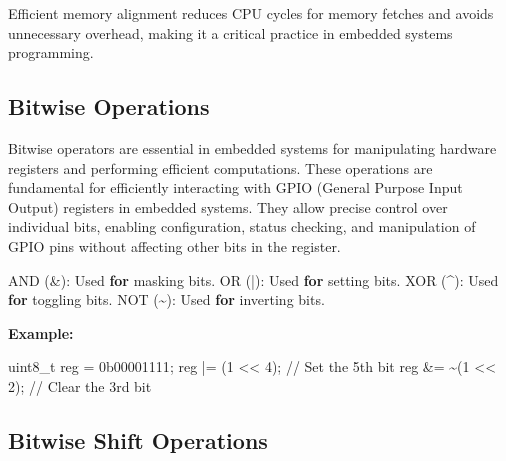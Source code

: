 \documentclass[
  9pt,
  letterpaper,
  abstract,
  titlepage]{scrbook}
\newenvironment{Shaded}{\begin{snugshade}}{\end{snugshade}}
\newcommand{\BaseNTok}[1]{\textcolor[rgb]{0.68,0.00,0.00}{#1}}
\newcommand{\CommentTok}[1]{\textcolor[rgb]{0.37,0.37,0.37}{#1}}
\newcommand{\ControlFlowTok}[1]{\textcolor[rgb]{0.00,0.23,0.31}{\textbf{#1}}}
\newcommand{\DataTypeTok}[1]{\textcolor[rgb]{0.68,0.00,0.00}{#1}}
\newcommand{\DecValTok}[1]{\textcolor[rgb]{0.68,0.00,0.00}{#1}}
\newcommand{\NormalTok}[1]{\textcolor[rgb]{0.00,0.23,0.31}{#1}}
\newcommand{\OperatorTok}[1]{\textcolor[rgb]{0.37,0.37,0.37}{#1}}
\begin{document}
Efficient memory alignment reduces CPU cycles for memory fetches and
avoids unnecessary overhead, making it a critical practice in embedded
systems programming.

\subsection{Bitwise Operations}\label{bitwise-operations}

Bitwise operators are essential in embedded systems for manipulating
hardware registers and performing efficient computations. These
operations are fundamental for efficiently interacting with GPIO
(General Purpose Input Output) registers in embedded systems. They allow
precise control over individual bits, enabling configuration, status
checking, and manipulation of GPIO pins without affecting other bits in
the register.

\begin{Shaded}
\begin{Highlighting}[]
\NormalTok{AND }\OperatorTok{(\&):}\NormalTok{ Used }\ControlFlowTok{for}\NormalTok{ masking bits}\OperatorTok{.}
\NormalTok{OR }\OperatorTok{(|):}\NormalTok{ Used }\ControlFlowTok{for}\NormalTok{ setting bits}\OperatorTok{.}
\NormalTok{XOR }\OperatorTok{(\^{}):}\NormalTok{ Used }\ControlFlowTok{for}\NormalTok{ toggling bits}\OperatorTok{.}
\NormalTok{NOT }\OperatorTok{(\textasciitilde{}):}\NormalTok{ Used }\ControlFlowTok{for}\NormalTok{ inverting bits}\OperatorTok{.}
\end{Highlighting}
\end{Shaded}

\textbf{Example:}

\begin{Shaded}
\begin{Highlighting}[]
\DataTypeTok{uint8\_t}\NormalTok{ reg }\OperatorTok{=} \BaseNTok{0b00001111}\OperatorTok{;}
\NormalTok{reg }\OperatorTok{|=} \OperatorTok{(}\DecValTok{1} \OperatorTok{\textless{}\textless{}} \DecValTok{4}\OperatorTok{);} \CommentTok{// Set the 5th bit}
\NormalTok{reg }\OperatorTok{\&=} \OperatorTok{\textasciitilde{}(}\DecValTok{1} \OperatorTok{\textless{}\textless{}} \DecValTok{2}\OperatorTok{);} \CommentTok{// Clear the 3rd bit}
\end{Highlighting}
\end{Shaded}

\subsection{Bitwise Shift Operations}\label{bitwise-shift-operations}
\end{document}
